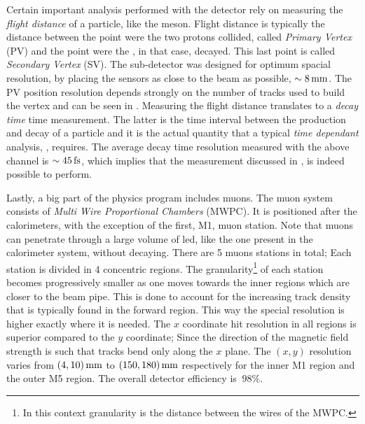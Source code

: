 Certain important analysis performed with the \lhcb detector rely on measuring the {\it flight distance} of a particle, like the \Bs meson.
Flight distance is typically the distance between the point were the two protons collided, called {\it Primary Vertex} (PV)
and the point were the \Bs, in that case, decayed. This last point is called {\it Secondary Vertex} (SV). The \velo sub-detector
was designed for optimum spacial resolution, by placing the \velo sensors as close to the beam as possible, $\sim 8 \rm \,mm$.
The PV position resolution depends strongly on the number of tracks used to build the vertex and can be seen in .
Measuring the flight distance translates to a {\it decay time} time measurement. The latter is the time interval between
the production and decay of a particle and it is the actual quantity that a typical {\it time dependant} analysis,
\eg \BsJpsiPhi, requires. The average decay time resolution measured with the above channel is $\sim 45\rm \,fs$, which
implies that the \phis measurement discussed in , is indeed possible to perform.

Lastly, a big part of the \lhcb physics program includes muons. The muon system consists of {\it Multi Wire Proportional Chambers}
(MWPC). It is positioned after the calorimeters, with the exception of the first, M1, muon station.
Note that muons can penetrate through a large volume of led, like the one present in the calorimeter system,
without decaying. There are 5 muons stations in total; Each station is divided in 4 concentric regions.
The granularity\footnote{In this context granularity is the distance between the wires of the MWPC.}
of each station becomes progressively smaller as one moves towards the inner regions which are closer to the beam pipe.
This is done to account for the increasing track density that is typically found in the forward region. This way
the special resolution is higher exactly where it is needed. The $x$ coordinate hit resolution in all regions
is superior compared to the $y$ coordinate; Since the direction of the \lhcb magnetic field strength
is such that tracks bend only along the $x$ plane. The $(x,y)$ resolution varies from $(4,10)\rm \,mm$ to $(150,180)\rm \,mm$
respectively for the inner M1 region and the outer M5 region. The overall detector efficiency is $\>98\%$.
